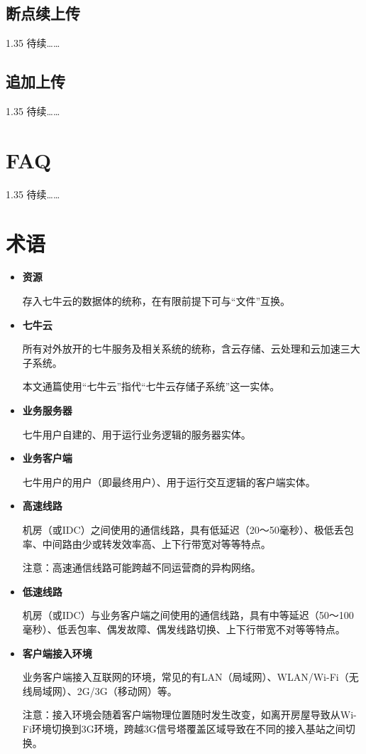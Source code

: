 \documentclass[11pt, oneside]{book}
\newcommand{\qhint}[1]{
\footnotesize
\vspace{0.2em}
\noindent
#1\par
\vspace{-0.5em}
\normalsize
}
\newcommand{\qpara}[1]{
\vspace{0.2em}
\begin{spacing}{1.35}
\noindent
#1\par
\end{spacing}
\vspace{0.2em}
}
\begin{document}
\section{断点续上传}

\qpara{待续……}

\section{追加上传}

\qpara{待续……}

\chapter{FAQ}

\qpara{待续……}

\chapter{术语}

\begin{itemize}
\item {\bf 资源}\par
\qhint{存入七牛云的数据体的统称，在有限前提下可与“文件”互换。}

\item {\bf 七牛云}\par
\qhint{所有对外放开的七牛服务及相关系统的统称，含云存储、云处理和云加速三大子系统。}
\qhint{本文通篇使用“七牛云”指代“七牛云存储子系统”这一实体。}

\item {\bf 业务服务器}\par
\qhint{七牛用户自建的、用于运行业务逻辑的服务器实体。}

\item {\bf 业务客户端}\par
\qhint{七牛用户的用户（即最终用户）、用于运行交互逻辑的客户端实体。}

\item {\bf 高速线路}\par
\qhint{机房（或IDC）之间使用的通信线路，具有低延迟（20～50毫秒）、极低丢包率、中间路由少或转发效率高、上下行带宽对等等特点。}
\qhint{注意：高速通信线路可能跨越不同运营商的异构网络。}

\item {\bf 低速线路}\par
\qhint{机房（或IDC）与业务客户端之间使用的通信线路，具有中等延迟（50～100毫秒）、低丢包率、偶发故障、偶发线路切换、上下行带宽不对等等特点。}

\item {\bf 客户端接入环境}\par
\qhint{业务客户端接入互联网的环境，常见的有LAN（局域网）、WLAN/Wi-Fi（无线局域网）、2G/3G（移动网）等。}
\qhint{注意：接入环境会随着客户端物理位置随时发生改变，如离开房屋导致从Wi-Fi环境切换到3G环境，跨越3G信号塔覆盖区域导致在不同的接入基站之间切换。}
\end{itemize}
\end{document}
